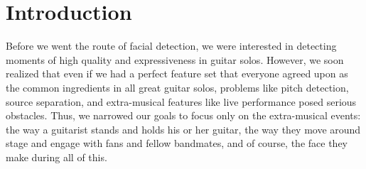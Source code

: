 \documentclass[twocolumn]{article}
\title{\papertitle}
\begin{document}
%
\capstartfalse
\maketitle
\capstarttrue
%
\begin{abstract}
It is difficult to tackle the problem of identifying ``awesomeness" without facing serious judgment calls on musical taste. One thing that does give away the joy and energy contained in a moment is the facial expression of a performer. Aiming to recognize the face a musician makes during an awesome musical moment, we created \textit{GuitarFace}, a Mac application with facial recognition via the OpenCV library. The user is a musician practicing their instrument either alone or across the network with a friend. Gameplay is a mix of MIDI guitar input visualization, counts of musical events like big jumps in pitch or power chords, and events initiated by making a guitar face. In another sense, GuitarFace is the beginnings of a ``funny face" detector.
\end{abstract}
%

\section{Introduction}\label{sec:introduction}
Before we went the route of facial detection, we were interested in detecting moments of high quality and expressiveness in guitar solos. However, we soon realized that even if we had a perfect feature set that everyone agreed upon as the common ingredients in all great guitar solos, problems like pitch detection, source separation, and extra-musical features like live performance posed serious obstacles. Thus, we narrowed our goals to focus only on the extra-musical events: the way a guitarist stands and holds his or her guitar, the way they move around stage and engage with fans and fellow bandmates, and of course, the face they make during all of this. 
\end{document}
